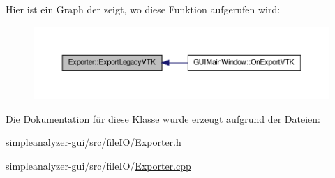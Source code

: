 Hier ist ein Graph der zeigt, wo diese Funktion aufgerufen wird\-:\nopagebreak
\begin{figure}[H]
\begin{center}
\leavevmode
\includegraphics[width=350pt]{classExporter_a59d03f0a582498e15397230b70ad1e80_icgraph}
\end{center}
\end{figure}




Die Dokumentation für diese Klasse wurde erzeugt aufgrund der Dateien\-:\begin{DoxyCompactItemize}
\item 
simpleanalyzer-\/gui/src/file\-I\-O/\hyperlink{Exporter_8h}{Exporter.\-h}\item 
simpleanalyzer-\/gui/src/file\-I\-O/\hyperlink{Exporter_8cpp}{Exporter.\-cpp}\end{DoxyCompactItemize}
